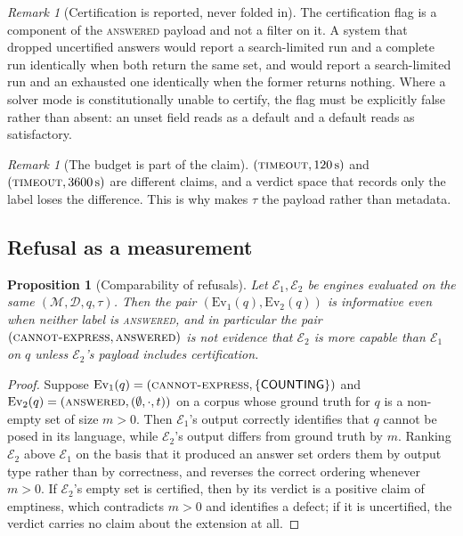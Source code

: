 \documentclass[11pt,a4paper]{article}
\theoremstyle{plain}
\newtheorem{proposition}[theorem]{Proposition}
\theoremstyle{definition}
\theoremstyle{remark}
\newtheorem{remark}[theorem]{Remark}
\newcommand{\Model}{\mathcal{M}}          %
\newcommand{\Corpus}{\mathcal{D}}         %
\newcommand{\Engine}{\mathcal{E}}         %
\newcommand{\vans}{\textsc{answered}}
\newcommand{\vexp}{\textsc{cannot-express}}
\newcommand{\vtime}{\textsc{timeout}}
\newcommand{\qq}{q}
\begin{document}
\begin{remark}[Certification is reported, never folded in]
\label{rem:certification}
The certification flag is a component of the \vans{} payload and not a filter
on it. A system that dropped uncertified answers would report a search-limited
run and a complete run identically when both return the same set, and would
report a search-limited run and an exhausted one identically when the former
returns nothing. Where a solver mode is constitutionally unable to certify,
the flag must be explicitly false rather than absent: an unset field reads as
a default and a default reads as satisfactory.
\end{remark}

\begin{remark}[The budget is part of the claim]
\label{rem:budget-in-payload}
$(\vtime, 120\,\mathrm{s})$ and $(\vtime, 3600\,\mathrm{s})$ are different
claims, and a verdict space that records only the label loses the difference.
This is why  makes $\tau$ the payload rather than metadata.
\end{remark}

\subsection{Refusal as a measurement}

\begin{proposition}[Comparability of refusals]
\label{prop:compare-refusals}
Let $\Engine_1, \Engine_2$ be engines evaluated on the same
$(\Model,\Corpus,\qq,\tau)$. Then the pair
$(\mathrm{Ev}_1(\qq), \mathrm{Ev}_2(\qq))$ is informative even when neither
label is \vans, and in particular the pair $(\vexp, \vans)$ is not evidence
that $\Engine_2$ is more capable than $\Engine_1$ on $\qq$ unless
$\Engine_2$'s payload includes certification.
\end{proposition}

\begin{proof}
Suppose $\mathrm{Ev}_1(\qq) = (\vexp, \{\textsf{COUNTING}\})$ and
$\mathrm{Ev}_2(\qq) = (\vans, (\emptyset, \cdot, t))$ on a corpus whose ground
truth for $\qq$ is a non-empty set of size $m > 0$. Then $\Engine_1$'s output
correctly identifies that $\qq$ cannot be posed in its language, while
$\Engine_2$'s output differs from ground truth by $m$. Ranking $\Engine_2$
above $\Engine_1$ on the basis that it produced an answer set orders them by
output type rather than by correctness, and reverses the correct ordering
whenever $m>0$. If $\Engine_2$'s empty set is certified, then by
 its verdict is a positive claim of emptiness, which
contradicts $m>0$ and identifies a defect; if it is uncertified, the verdict
carries no claim about the extension at all.
\end{proof}
\end{document}
